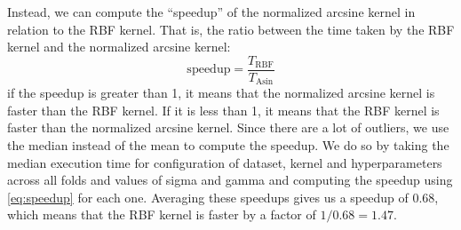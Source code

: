 Instead, we can compute the ``speedup'' of the normalized arcsine kernel
in relation to the RBF kernel. That is, the ratio between the time taken
by the RBF kernel and the normalized arcsine kernel:
\begin{equation}
    \text{speedup} = \frac{T_{\text{RBF}}}{T_{\text{Asin}}} \label{eq:speedup}
\end{equation}
if the speedup is greater than 1, it means that the normalized arcsine kernel
is faster than the RBF kernel. If it is less than 1, it means that the RBF
kernel is faster than the normalized arcsine kernel. Since there are a lot
of outliers, we use the median instead of the mean to compute the speedup. We
do so by taking the median execution time for configuration of dataset, kernel
and hyperparameters across all folds and values of sigma and gamma and computing
the speedup using \cref{eq:speedup} for each one. Averaging these speedups
gives us a speedup of $0.68$, which means that the RBF kernel is faster by
a factor of $1/0.68 = 1.47$.
